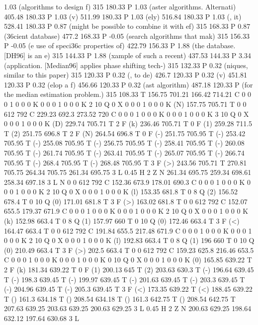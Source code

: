 1.03 (algorithms to design f) 315 180.33 P
1.03 (aster algorithms. Alternati) 405.48 180.33 P
1.03 (v) 511.99 180.33 P
1.03 (ely) 516.84 180.33 P
1.03 (, it) 528.41 180.33 P
0.87 (might be possible to combine it with ef) 315 168.33 P
0.87 (\336cient database) 477.2 168.33 P
-0.05 (search algorithms that mak) 315 156.33 P
-0.05 (e use of speci\336c properties of) 422.79 156.33 P
1.88 (the database. [DH96] is an e) 315 144.33 P
1.88 (xample of such a recent) 437.53 144.33 P
3.34 (application. [Median96] applies phase shifting tech-) 315 132.33 P
0.32 (niques, similar to this paper) 315 120.33 P
0.32 (, to de) 426.7 120.33 P
0.32 (v) 451.81 120.33 P
0.32 (elop a f) 456.66 120.33 P
0.32 (ast algorithm) 487.18 120.33 P
(for the median estimation problem.) 315 108.33 T
156.75 701.21 166.42 714.21 C
0 0 0 1 0 0 0 K
0 0 0 1 0 0 0 K
2 10 Q
0 X
0 0 0 1 0 0 0 K
(N) 157.75 705.71 T
0 0 612 792 C
229.23 692.3 273.52 720 C
0 0 0 1 0 0 0 K
0 0 0 1 0 0 0 K
3 10 Q
0 X
0 0 0 1 0 0 0 K
(D) 229.74 705.71 T
2 F
(k) 236.46 705.71 T
0 F
(1) 259.28 711.5 T
(2) 251.75 696.8 T
2 F
(N) 264.54 696.8 T
0 F
(-) 251.75 705.95 T
(-) 253.42 705.95 T
(-) 255.08 705.95 T
(-) 256.75 705.95 T
(-) 258.41 705.95 T
(-) 260.08 705.95 T
(-) 261.74 705.95 T
(-) 263.41 705.95 T
(-) 265.07 705.95 T
(-) 266.74 705.95 T
(-) 268.4 705.95 T
(-) 268.48 705.95 T
3 F
(>) 243.56 705.71 T
270.81 705.75 264.34 705.75 261.34 695.75 3 L
0.45 H
2 Z
N
261.34 695.75 259.34 698.61 258.34 697.18 3 L
N
0 0 612 792 C
152.36 673.9 178.01 690.3 C
0 0 0 1 0 0 0 K
0 0 0 1 0 0 0 K
2 10 Q
0 X
0 0 0 1 0 0 0 K
(l) 153.35 681.8 T
0 8 Q
(2) 156.52 678.4 T
0 10 Q
(0) 171.01 681.8 T
3 F
(>) 163.02 681.8 T
0 0 612 792 C
152.07 655.5 179.37 671.9 C
0 0 0 1 0 0 0 K
0 0 0 1 0 0 0 K
2 10 Q
0 X
0 0 0 1 0 0 0 K
(k) 152.98 663.4 T
0 8 Q
(1) 157.97 660 T
0 10 Q
(0) 172.46 663.4 T
3 F
(<) 164.47 663.4 T
0 0 612 792 C
191.84 655.5 217.48 671.9 C
0 0 0 1 0 0 0 K
0 0 0 1 0 0 0 K
2 10 Q
0 X
0 0 0 1 0 0 0 K
(l) 192.83 663.4 T
0 8 Q
(1) 196 660 T
0 10 Q
(0) 210.49 663.4 T
3 F
(>) 202.5 663.4 T
0 0 612 792 C
159.23 625.8 216.46 653.5 C
0 0 0 1 0 0 0 K
0 0 0 1 0 0 0 K
0 10 Q
0 X
0 0 0 1 0 0 0 K
(0) 165.85 639.22 T
2 F
(k) 181.34 639.22 T
0 F
(1) 200.13 645 T
(2) 203.63 630.3 T
(-) 196.64 639.45 T
(-) 198.3 639.45 T
(-) 199.97 639.45 T
(-) 201.63 639.45 T
(-) 203.3 639.45 T
(-) 204.96 639.45 T
(-) 205.3 639.45 T
3 F
(<) 173.35 639.22 T
(<) 188.45 639.22 T
() 161.3 634.18 T
() 208.54 634.18 T
() 161.3 642.75 T
() 208.54 642.75 T
207.63 639.25 203.63 639.25 200.63 629.25 3 L
0.45 H
2 Z
N
200.63 629.25 198.64 632.12 197.64 630.68 3 L

